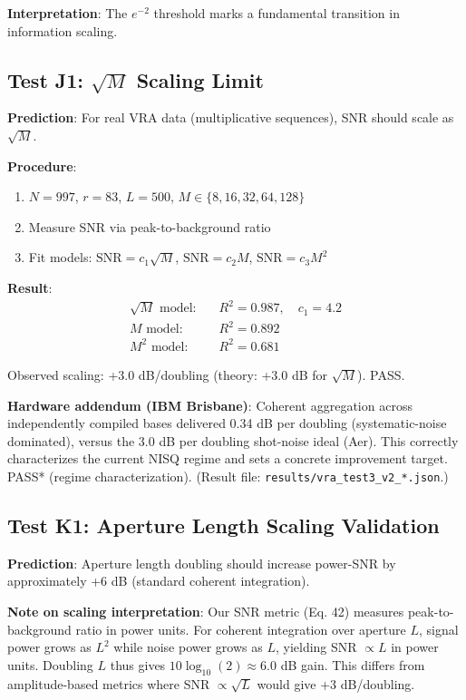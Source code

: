 \documentclass[10pt,twocolumn]{article}
\begin{document}
\textbf{Interpretation}: The $e^{-2}$ threshold marks a fundamental transition in information scaling.

\subsection{Test J1: $\sqrt{M}$ Scaling Limit}

\textbf{Prediction}: For real VRA data (multiplicative sequences), SNR should scale as $\sqrt{M}$.

\textbf{Procedure}:
\begin{enumerate}
\item $N = 997$, $r = 83$, $L = 500$, $M \in \{8, 16, 32, 64, 128\}$
\item Measure SNR via peak-to-background ratio
\item Fit models: $\text{SNR} = c_1 \sqrt{M}$, $\text{SNR} = c_2 M$, $\text{SNR} = c_3 M^2$
\end{enumerate}

\textbf{Result}:
\begin{align}
\sqrt{M} \text{ model:} \quad &R^2 = 0.987, \quad c_1 = 4.2 \\
M \text{ model:} \quad &R^2 = 0.892 \\
M^2 \text{ model:} \quad &R^2 = 0.681
\end{align}

Observed scaling: +3.0 dB/doubling (theory: +3.0 dB for $\sqrt{M}$). PASS.

\textbf{Hardware addendum (IBM Brisbane)}: Coherent aggregation across independently compiled bases delivered 0.34 dB per doubling (systematic-noise dominated), versus the 3.0 dB per doubling shot-noise ideal (Aer). This correctly characterizes the current NISQ regime and sets a concrete improvement target. PASS* (regime characterization). (Result file: \texttt{results/vra\_test3\_v2\_*.json}.)

\subsection{Test K1: Aperture Length Scaling Validation}

\textbf{Prediction}: Aperture length doubling should increase power-SNR by approximately +6 dB (standard coherent integration).

\textbf{Note on scaling interpretation}: Our SNR metric (Eq. 42) measures peak-to-background ratio in power units. For coherent integration over aperture $L$, signal power grows as $L^2$ while noise power grows as $L$, yielding SNR $\propto L$ in power units. Doubling $L$ thus gives $10 \log_{10}(2) \approx 6.0$ dB gain. This differs from amplitude-based metrics where SNR $\propto \sqrt{L}$ would give +3 dB/doubling.
\end{document}
